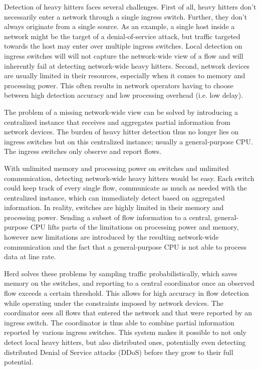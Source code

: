 \documentclass[11pt,oneside,a4paper]{article}
\begin{document}
Detection of heavy hitters faces several challenges. First of all, heavy hitters don't necessarily enter a network through a single ingress switch. Further, they don't always originate from a single source. As an example, a single host inside a network might be the target of a denial-of-service attack, but traffic targeted towards the host may enter over multiple ingress switches. Local detection on ingress switches will will not capture the network-wide view of a flow and will inherently fail at detecting network-wide heavy hitters. Second, network devices are usually limited in their resources, especially when it comes to memory and processing power. This often results in network operators having to choose between high detection accuracy and low processing overhead (i.e. low delay).

\noindent The problem of a missing network-wide view can be solved by introducing a centralized instance that receives and aggregates partial information from network devices. The burden of heavy hitter detection thus no longer lies on ingress switches but on this centralized instance; usually a general-purpose CPU. The ingress switches only observe and report flows.

\noindent With unlimited memory and processing power on switches and unlimited communication, detecting network-wide heavy hitters would be easy. Each switch could keep track of every single flow, communicate as much as needed with the centralized instance, which can immediately detect based on aggregated information. In reality, switches are highly limited in their memory and processing power. Sending a subset of flow information to a central, general-purpose CPU lifts parts of the limitations on processing power and memory, however new limitations are introduced by the resulting network-wide communication and the fact that a general-purpose CPU is not able to process data at line rate.


Herd \cite{anon2019herd} solves these problems by sampling traffic probabilistically, which saves memory on the switches, and reporting to a central coordinator once an observed flow exceeds a certain threshold. This allows for high accuracy in flow detection while operating under the constraints imposed by network devices. The coordinator sees all flows that entered the network and that were reported by an ingress switch. The coordinator is thus able to combine partial information reported by various ingress switches. This system makes it possible to not only detect local heavy hitters, but also distributed ones, potentially even detecting distributed Denial of Service attacks (DDoS) before they grow to their full potential.
\end{document}
